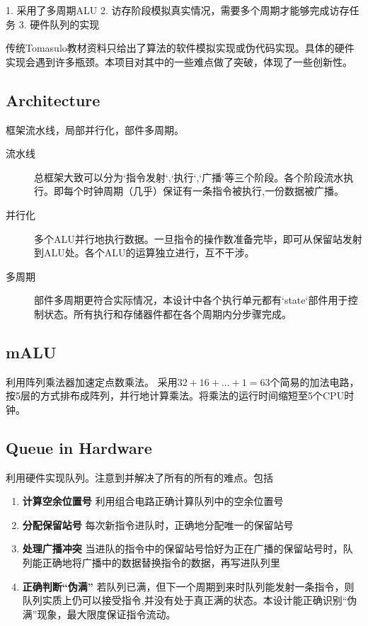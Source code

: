 \documentclass[twoside]{article}
\begin{document}
1. 采用了多周期ALU
2. 访存阶段模拟真实情况，需要多个周期才能够完成访存任务
3. 硬件队列的实现

传统Tomasulo教材资料只给出了算法的软件模拟实现或伪代码实现。具体的硬件实现会遇到许多瓶颈。本项目对其中的一些难点做了突破，体现了一些创新性。
\subsection{Architecture}
框架流水线，局部并行化，部件多周期。  
\begin{description}
	\item[流水线] 总框架大致可以分为`指令发射`,`执行`,`广播`等三个阶段。各个阶段流水执行。即每个时钟周期（几乎）保证有一条指令被执行,一份数据被广播。
	\item[并行化] 多个ALU并行地执行数据。一旦指令的操作数准备完毕，即可从保留站发射到ALU处。各个ALU的运算独立进行，互不干涉。
	\item[多周期] 部件多周期更符合实际情况，本设计中各个执行单元都有`state`部件用于控制状态。所有执行和存储器件都在各个周期内分步骤完成。
\end{description}

\subsection{mALU}

利用阵列乘法器加速定点数乘法。  
采用$32 + 16 +... +1=63$个简易的加法电路，按5层的方式排布成阵列，并行地计算乘法。将乘法的运行时间缩短至5个CPU时钟。

\subsection{Queue in Hardware}
利用硬件实现队列。注意到并解决了所有的所有的难点。包括 
\begin{enumerate}
	\item \textbf{计算空余位置号   }利用组合电路正确计算队列中的空余位置号
	\item \textbf{分配保留站号   } 每次新指令进队时，正确地分配唯一的保留站号
	\item \textbf{处理广播冲突   }当进队的指令中的保留站号恰好为正在广播的保留站号时，队列能正确地将广播中的数据替换指令的数据，再写进队列里
	\item \textbf{正确判断“伪满”   }若队列已满，但下一个周期到来时队列能发射一条指令，则队列实质上仍可以接受指令,并没有处于真正满的状态。本设计能正确识别“伪满”现象，最大限度保证指令流动。
\end{enumerate} 
  
\end{document}
